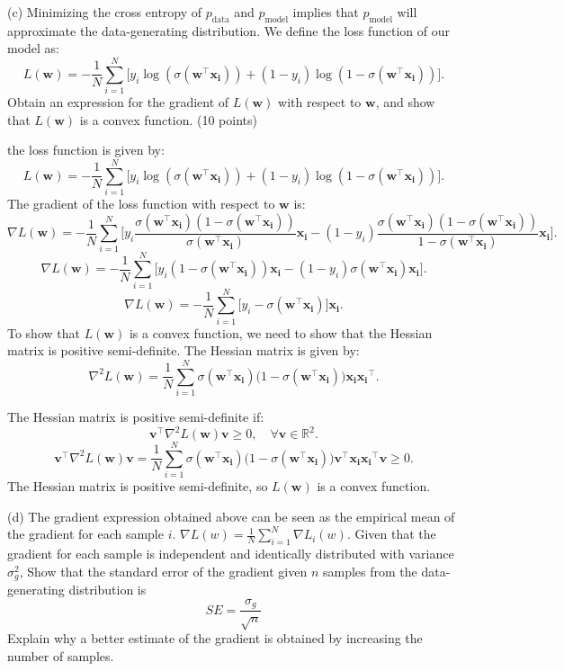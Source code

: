 \documentclass[a3paper,12pt]{article} %
\begin{document}
(c)
Minimizing the cross entropy of $p_{\text{data}}$ and $p_{\text{model}}$ implies that $p_{\text{model}}$ will approximate the data-generating distribution. We define the loss function of our model as:
\[
L(\mathbf{w}) = -\frac{1}{N} \sum^N_{i=1} \big[y_i \log(\sigma(\mathbf{w}^\top \mathbf{x_i})) + (1-y_i) \log(1-\sigma(\mathbf{w}^\top \mathbf{x_i}))\big].
\]
Obtain an expression for the gradient of $L(\mathbf{w})$ with respect to $\mathbf{w}$, and show that $L(\mathbf{w})$ is a convex function.
\hfill (10 points)

the loss function is given by:
\[
L(\mathbf{w}) = -\frac{1}{N} \sum^N_{i=1} \big[y_i \log(\sigma(\mathbf{w}^\top \mathbf{x_i})) + (1-y_i) \log(1-\sigma(\mathbf{w}^\top \mathbf{x_i}))\big].
\]
The gradient of the loss function with respect to $\mathbf{w}$ is:
\[
\nabla L(\mathbf{w}) = -\frac{1}{N} \sum^N_{i=1} \big[y_i \frac{\sigma(\mathbf{w}^\top \mathbf{x_i})(1 - \sigma(\mathbf{w}^\top \mathbf{x_i}))}{\sigma(\mathbf{w}^\top \mathbf{x_i})} \mathbf{x_i} - (1-y_i) \frac{\sigma(\mathbf{w}^\top \mathbf{x_i})(1 - \sigma(\mathbf{w}^\top \mathbf{x_i}))}{1 - \sigma(\mathbf{w}^\top \mathbf{x_i})} \mathbf{x_i}\big].
\]
\[
\nabla L(\mathbf{w}) = -\frac{1}{N} \sum^N_{i=1} \big[y_i (1 - \sigma(\mathbf{w}^\top \mathbf{x_i})) \mathbf{x_i} - (1-y_i) \sigma(\mathbf{w}^\top \mathbf{x_i}) \mathbf{x_i}\big].
\]
\[
\nabla L(\mathbf{w}) = -\frac{1}{N} \sum^N_{i=1} \big[y_i - \sigma(\mathbf{w}^\top \mathbf{x_i})\big] \mathbf{x_i}.
\]
To show that $L(\mathbf{w})$ is a convex function, we need to show that the Hessian matrix is positive semi-definite. The Hessian matrix is given by:
\[
\nabla^2 L(\mathbf{w}) = \frac{1}{N} \sum^N_{i=1} \sigma(\mathbf{w}^\top \mathbf{x_i}) \big(1 - \sigma(\mathbf{w}^\top \mathbf{x_i})\big) \mathbf{x_i} \mathbf{x_i}^\top.
\]

The Hessian matrix is positive semi-definite if:
\[
\mathbf{v}^\top \nabla^2 L(\mathbf{w}) \mathbf{v} \geq 0, \quad \forall \mathbf{v} \in \mathbb{R}^2.
\]
\[
\mathbf{v}^\top \nabla^2 L(\mathbf{w}) \mathbf{v} = \frac{1}{N} \sum^N_{i=1} \sigma(\mathbf{w}^\top \mathbf{x_i}) \big(1 - \sigma(\mathbf{w}^\top \mathbf{x_i})\big) \mathbf{v}^\top \mathbf{x_i} \mathbf{x_i}^\top \mathbf{v} \geq 0.
\]
The Hessian matrix is positive semi-definite, so $L(\mathbf{w})$ is a convex function.

(d)
The gradient expression obtained above can be seen as the empirical mean of the gradient for each sample $i$. \(\nabla L(w) = \frac{1}{N}\sum^N_{i=1}\nabla L_i(w)\). Given that the gradient for each sample is independent and identically distributed with variance $\sigma_g^2$, Show that the standard error of the gradient given $n$ samples from the data-generating distribution is \[SE = \frac{\sigma_g}{\sqrt{n}}\] 
Explain why a better estimate of the gradient is obtained by increasing the number of samples.
\end{document}
